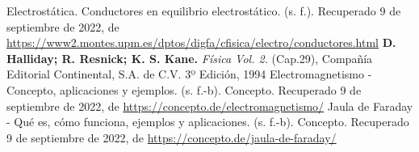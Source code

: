 \documentclass[a4paper, 12p]{article}
\begin{document}
\begin{thebibliography}{5}
      Electrostática. Conductores en equilibrio electrostático. (s. f.). Recuperado 9 de septiembre de 2022, 
    de \url{https://www2.montes.upm.es/dptos/digfa/cfisica/electro/conductores.html}
     \textbf{D. Halliday; R. Resnick; K. S. Kane.} \textit{Física Vol. 2.} (Cap.29), Compañía Editorial Continental, S.A. de C.V. 3º Edición, 1994
     Electromagnetismo - Concepto, aplicaciones y ejemplos. (s. f.-b). Concepto. Recuperado 9 de septiembre de 2022,
     de \url{https://concepto.de/electromagnetismo/}
    Jaula de Faraday - Qué es, cómo funciona, ejemplos y aplicaciones. (s. f.-b). Concepto. Recuperado 9 de septiembre de 2022, 
    de \url{https://concepto.de/jaula-de-faraday/}
\end{thebibliography}
\end{document}

